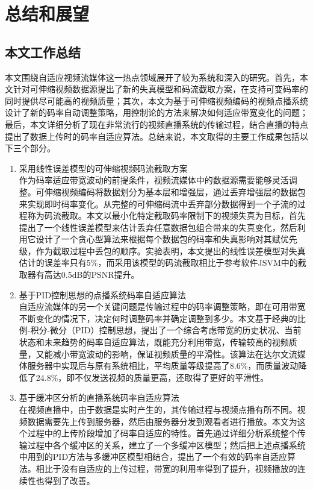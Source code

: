 \chapter{总结和展望}

\section{本文工作总结}

本文围绕自适应视频流媒体这一热点领域展开了较为系统和深入的研究。首先，本文针对可伸缩视频数据源提出了新的失真模型和码流截取方案，在支持可变码率的同时提供尽可能高的视频质量；其次，本文为基于可伸缩视频编码的视频点播系统设计了新的码率自动调整策略，用控制论的方法来解决如何适应带宽变化的问题；最后，本文详细分析了现在非常流行的视频直播系统的传输过程，结合直播的特点提出了数据上传时的码率自适应算法。总结来说，本文取得的主要工作成果包括以下三个部分。
\begin{enumerate}
\item {采用线性误差模型的可伸缩视频码流截取方案} \\
作为码率适应带宽波动的前提条件，视频流媒体中的数据源需要能够灵活调整。可伸缩视频编码将数据划分为基本层和增强层，通过丢弃增强层的数据包来实现即时码率变化。从完整的可伸缩码流中丢弃部分数据得到一个子流的过程称为码流截取。本文以最小化特定截取码率限制下的视频失真为目标，首先提出了一个线性误差模型来估计丢弃任意数据包组合带来的失真变化，然后利用它设计了一个贪心型算法来根据每个数据包的码率和失真影响对其赋优先级，作为截取过程中丢包的顺序。实验表明，本文提出的线性误差模型对失真估计的误差率只有5\%，而采用该模型的码流截取相比于参考软件JSVM中的截取器有高达0.5dB的PSNR提升。
\item {基于PID控制思想的点播系统码率自适应算法} \\
自适应流媒体的另一个关键问题是传输过程中的码率调整策略，即在可用带宽不断变化的情况下，决定何时调整码率并确定调整到多少。本文基于经典的比例-积分-微分（PID）控制思想，提出了一个综合考虑带宽的历史状况、当前状态和未来趋势的码率自适应算法，既能充分利用带宽，传输较高的视频质量，又能减小带宽波动的影响，保证视频质量的平滑性。该算法在达尔文流媒体服务器中实现后与原有系统相比，平均质量等级提高了8.6\%，而质量波动降低了24.8\%，即不仅发送视频的质量更高，还取得了更好的平滑性。
\item {基于缓冲区分析的直播系统码率自适应算法} \\
在视频直播中，由于数据是实时产生的，其传输过程与视频点播有所不同。视频数据需要先上传到服务器，然后由服务器分发到观看者进行播放。本文为这个过程中的上传阶段增加了码率自适应的特性。首先通过详细分析系统整个传输过程中各个缓冲区的关系，建立了一个多缓冲区模型；然后把上述点播系统中用到的PID方法与多缓冲区模型相结合，提出了一个有效的码率自适应算法。相比于没有自适应的上传过程，带宽的利用率得到了提升，视频播放的连续性也得到了改善。
\end{enumerate}

